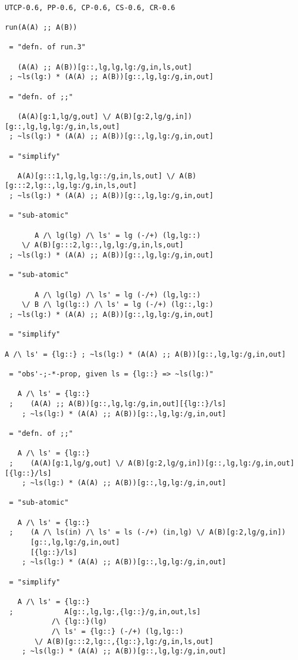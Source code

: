 \begin{verbatim}

UTCP-0.6, PP-0.6, CP-0.6, CS-0.6, CR-0.6

run(A(A) ;; A(B))

 = "defn. of run.3"

   (A(A) ;; A(B))[g::,lg,lg,lg:/g,in,ls,out]
 ; ~ls(lg:) * (A(A) ;; A(B))[g::,lg,lg:/g,in,out]

 = "defn. of ;;"

   (A(A)[g:1,lg/g,out] \/ A(B)[g:2,lg/g,in])[g::,lg,lg,lg:/g,in,ls,out]
 ; ~ls(lg:) * (A(A) ;; A(B))[g::,lg,lg:/g,in,out]

 = "simplify"

   A(A)[g:::1,lg,lg,lg::/g,in,ls,out] \/ A(B)[g:::2,lg::,lg,lg:/g,in,ls,out]
 ; ~ls(lg:) * (A(A) ;; A(B))[g::,lg,lg:/g,in,out]

 = "sub-atomic"

       A /\ lg(lg) /\ ls' = lg (-/+) (lg,lg::)
    \/ A(B)[g:::2,lg::,lg,lg:/g,in,ls,out]
 ; ~ls(lg:) * (A(A) ;; A(B))[g::,lg,lg:/g,in,out]

 = "sub-atomic"

       A /\ lg(lg) /\ ls' = lg (-/+) (lg,lg::)
    \/ B /\ lg(lg::) /\ ls' = lg (-/+) (lg::,lg:)
 ; ~ls(lg:) * (A(A) ;; A(B))[g::,lg,lg:/g,in,out]

 = "simplify"

A /\ ls' = {lg::} ; ~ls(lg:) * (A(A) ;; A(B))[g::,lg,lg:/g,in,out]

 = "obs'-;-*-prop, given ls = {lg::} => ~ls(lg:)"

   A /\ ls' = {lg::}
 ;    (A(A) ;; A(B))[g::,lg,lg:/g,in,out][{lg::}/ls]
    ; ~ls(lg:) * (A(A) ;; A(B))[g::,lg,lg:/g,in,out]

 = "defn. of ;;"

   A /\ ls' = {lg::}
 ;    (A(A)[g:1,lg/g,out] \/ A(B)[g:2,lg/g,in])[g::,lg,lg:/g,in,out][{lg::}/ls]
    ; ~ls(lg:) * (A(A) ;; A(B))[g::,lg,lg:/g,in,out]

 = "sub-atomic"

   A /\ ls' = {lg::}
 ;    (A /\ ls(in) /\ ls' = ls (-/+) (in,lg) \/ A(B)[g:2,lg/g,in])
      [g::,lg,lg:/g,in,out]
      [{lg::}/ls]
    ; ~ls(lg:) * (A(A) ;; A(B))[g::,lg,lg:/g,in,out]

 = "simplify"

   A /\ ls' = {lg::}
 ;            A[g::,lg,lg:,{lg::}/g,in,out,ls]
           /\ {lg::}(lg)
           /\ ls' = {lg::} (-/+) (lg,lg::)
       \/ A(B)[g:::2,lg::,{lg::},lg:/g,in,ls,out]
    ; ~ls(lg:) * (A(A) ;; A(B))[g::,lg,lg:/g,in,out]


\end{verbatim}
